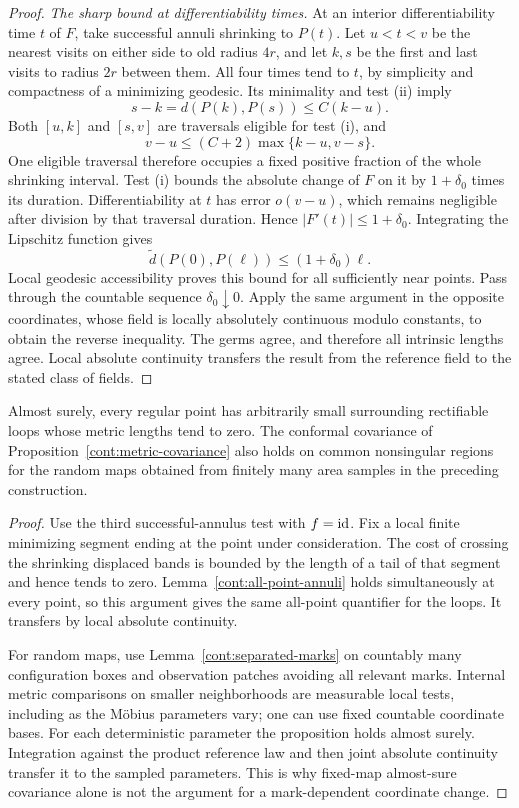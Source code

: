 \begin{proof}
\emph{The sharp bound at differentiability times.}
At an interior differentiability time $t$ of $F$, take successful annuli
shrinking to $P(t)$.  Let $u<t<v$ be the nearest visits on either side to
old radius $4r$, and let $k,s$ be the first and last visits to radius $2r$
between them.  All four times tend to $t$, by simplicity and compactness
of a minimizing geodesic.  Its minimality and test (ii) imply
\[
 s-k=d(P(k),P(s))\leq C(k-u).
\]
Both $[u,k]$ and $[s,v]$ are traversals eligible for test (i), and
\[
 v-u\leq(C+2)\max\{k-u,v-s\}.
\]
One eligible traversal therefore occupies a fixed positive fraction of
the whole shrinking interval.  Test (i) bounds the absolute change of $F$
on it by $1+\delta_0$ times its duration.  Differentiability at $t$ has
error $o(v-u)$, which remains negligible after division by that traversal
duration.  Hence $|F'(t)|\leq1+\delta_0$.  Integrating the Lipschitz function
gives
\[
 \widetilde d(P(0),P(\ell))\leq(1+\delta_0)\ell.
\]
Local geodesic accessibility proves this bound for all sufficiently near
points.  Pass through the countable sequence $\delta_0\downarrow0$.
Apply the same argument in the opposite coordinates, whose field is
locally absolutely continuous modulo constants, to obtain the reverse
inequality.  The germs agree, and therefore all intrinsic lengths agree.
Local absolute continuity transfers the result from the reference field
to the stated class of fields.
\end{proof}

\begin{corollary}
\label{cont:detours}
Almost surely, every regular point has arbitrarily small surrounding
rectifiable loops whose metric lengths tend to zero.  The conformal
covariance of Proposition~\ref{cont:metric-covariance} also holds on common
nonsingular regions for the random maps obtained from finitely many area
samples in the preceding construction.
\end{corollary}

\begin{proof}
Use the third successful-annulus test with $f=\operatorname{id}$.  Fix a local finite
minimizing segment ending at the point under consideration.  The cost of
crossing the shrinking displaced bands is bounded by the length of a tail
of that segment and hence tends to zero.  Lemma~\ref{cont:all-point-annuli}
holds simultaneously at every point, so this argument gives the same
all-point quantifier for the loops.  It transfers by local absolute
continuity.

For random maps, use Lemma~\ref{cont:separated-marks} on countably many
configuration boxes and observation patches avoiding all relevant marks.
Internal metric comparisons on smaller neighborhoods are measurable local
tests, including as the M\"obius parameters vary; one can use fixed countable
coordinate bases.  For each deterministic parameter the proposition holds
almost surely.  Integration against the product reference law and then
joint absolute continuity transfer it to the sampled parameters.  This is
why fixed-map almost-sure covariance alone is not the argument for a
mark-dependent coordinate change.
\end{proof}

